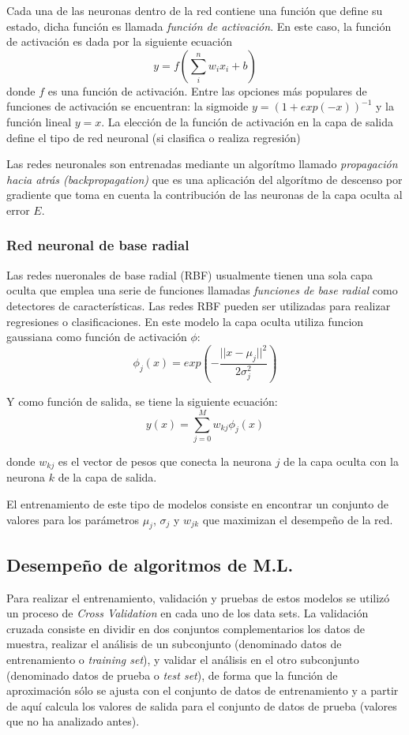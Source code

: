 {Cada una de las neuronas dentro de la red contiene una función que define su estado, dicha función es llamada \emph{función de activación}. En este caso, la función de activación es dada por la siguiente ecuación $$y=f(\sum_{i}^{n} w_ix_i+b)$$ donde $f$ es una función de activación. Entre las opciones más populares de funciones de activación se encuentran: la sigmoide $y = (1+exp(-x))^{-1}$ y la función lineal $y=x$. La elección de la función de activación en la capa de salida define el tipo de red neuronal (si clasifica o realiza regresión)

Las redes neuronales son entrenadas mediante un algorítmo llamado \emph{propagación hacia atrás (backpropagation)} que es una aplicación del algorítmo de descenso por gradiente que toma en cuenta la contribución de las neuronas de la capa oculta al error $E$.

\subsubsection*{Red neuronal de base radial}

Las redes nueronales de base radial (RBF) usualmente tienen una sola capa oculta que emplea una serie de funciones llamadas \emph{funciones de base radial} como detectores de características. Las redes RBF pueden ser utilizadas para realizar regresiones o clasificaciones. En este modelo la capa oculta utiliza funcion gaussiana como función de activación $\phi$: $$\phi_j(x)=exp(-\frac{||x-\mu_j||^2}{2\sigma_j^2})$$

Y como función de salida, se tiene la siguiente ecuación: $$y(x)=\sum_{j=0}^{M} w_{kj} \phi_j(x)$$

donde $w_{kj}$ es el vector de pesos que conecta la neurona $j$ de la capa oculta con la neurona $k$ de la capa de salida.

El entrenamiento de este tipo de modelos consiste en encontrar un conjunto de valores para los parámetros $\mu_j$, $\sigma_j$ y $w_{jk}$ que maximizan el desempeño de la red. 

\subsection*{Desempeño de algoritmos de M.L.}

Para realizar el entrenamiento, validación y pruebas de estos modelos se utilizó un proceso de \emph{Cross Validation} en cada uno de los data sets.  La validación cruzada consiste en dividir en dos conjuntos complementarios los datos de muestra, realizar el análisis de un subconjunto (denominado datos de entrenamiento o \emph{training set}), y validar el análisis en el otro subconjunto (denominado datos de prueba o \emph{test set}), de forma que la función de aproximación sólo se ajusta con el conjunto de datos de entrenamiento y a partir de aquí calcula los valores de salida para el conjunto de datos de prueba (valores que no ha analizado antes).

}
